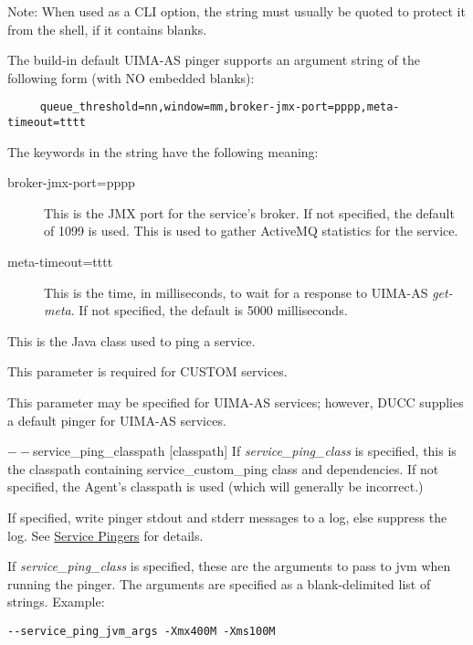 \begin{description}
        Note: When used as a CLI option, the string must usually be
        quoted to protect it from the shell, if it contains blanks.

        The build-in default UIMA-AS pinger supports an argument string of the following form
        (with NO embedded blanks):
\begin{verbatim}
     queue_threshold=nn,window=mm,broker-jmx-port=pppp,meta-timeout=tttt
\end{verbatim}
        
        The keywords in the string have the following meaning:
        \begin{description}
          \item[broker-jmx-port=pppp] This is the JMX port for the service's broker.  If not
            specified, the default of 1099 is used.  This is used to gather ActiveMQ statistics
            for the service.
          \item[meta-timeout=tttt] This is the time, in milliseconds, to wait for a response
            to UIMA-AS {\em get-meta}.  If not specified, the default is 5000 milliseconds.
        \end{description}
      
      \item[$--$service\_ping\_class {[classname]}] This is the Java class used to ping a service. 

        This parameter is required for CUSTOM services.

        This parameter may be specified for UIMA-AS services; however, DUCC supplies a default
        pinger for UIMA-AS services.

      \begin{sloppypar}  
      \item[$--$service\_ping\_classpath {[classpath]}] If {\em service\_ping\_class} is specified,
        this is the classpath containing service\_custom\_ping class and dependencies.  If not
        specified, the Agent's classpath is used (which will generally be incorrect.)
      \end{sloppypar}
      
      \item[$--$service\_ping\_dolog {[boolean]}] If specified, write pinger stdout and stderr
        messages to a log, else suppress the log. See \hyperref[sec:service.pingers]{Service Pingers}
        for details.

      \item[$--$service\_ping\_jvm\_args {[string]}] If 
        {\em service\_ping\_class} is specified, these are the arguments 
        to pass to jvm when running the pinger. The arguments are specified as a blank-delimited
        list of strings.  Example:
\begin{verbatim}
--service_ping_jvm_args -Xmx400M -Xms100M
\end{verbatim}
        

\end{description}
